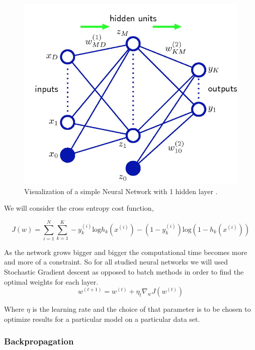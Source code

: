 \documentclass[12pt, twocolumn]{article}
\begin{document}
\begin{figure}
\includegraphics[scale=.6]{simpleNN.png}

\caption{Visualization of a simple Neural Network with 1 hidden layer \cite{Bishop} . }
\label{fig:basicNN}
\end{figure}


We will consider the cross entropy cost function, 

\begin{equation*}
J(w)= \sum_{i=1}^N \sum_{k=1}^K -y^{(i)}_k \textrm{log}h_k(x^{(i)})- (1 -y^{(i)}_k) \textrm{log}(1 -h_k(x^{(i)}))
\end {equation*}



As the network grows bigger and bigger the computational time becomes more and more of a constraint. So for all studied neural  networks we will used Stochastic Gradient descent as opposed to batch methods in order to find the optimal weights for each layer. 
\begin{equation}
w^{(t+1)} = w^{(t)} + \eta_t \nabla_w J(w^{(t)})
\end{equation}

Where $\eta$ is  the learning rate and the choice of that parameter is to be chosen to optimize results for a particular model on a particular data set.


\subsubsection{Backpropagation}
\end{document}
